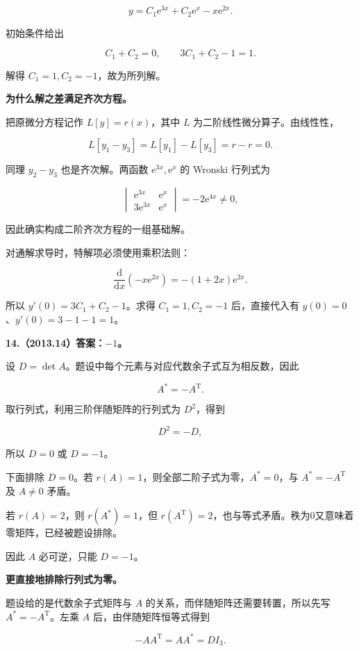 \documentclass[UTF8,11pt,fontset=windows]{ctexart}
\begin{document}
$$
y=C_1\mathrm e^{3x}+C_2\mathrm e^x-x\mathrm e^{2x}.
$$

初始条件给出

$$
C_1+C_2=0,\qquad3C_1+C_2-1=1.
$$

解得 $C_1=1,C_2=-1$，故为所列解。

\textbf{为什么解之差满足齐次方程。}

把原微分方程记作 $L[y]=r(x)$，其中 $L$ 为二阶线性微分算子。由线性性，

$$
L[y_1-y_3]=L[y_1]-L[y_3]=r-r=0.
$$

同理 $y_2-y_3$ 也是齐次解。两函数 $\mathrm e^{3x},\mathrm e^x$ 的 Wronski 行列式为

$$
\begin{vmatrix}\mathrm e^{3x}&\mathrm e^x\\3\mathrm e^{3x}&\mathrm e^x\end{vmatrix}
=-2\mathrm e^{4x}\ne0,
$$

因此确实构成二阶齐次方程的一组基础解。

对通解求导时，特解项必须使用乘积法则：

$$
\frac{\mathrm d}{\mathrm dx}(-x\mathrm e^{2x})=-(1+2x)\mathrm e^{2x}.
$$

所以 $y'(0)=3C_1+C_2-1$。求得 $C_1=1,C_2=-1$ 后，直接代入有 $y(0)=0$、$y'(0)=3-1-1=1$。

\clearpage

\textbf{14.（2013.14）答案：$-1$。}

设 $D=\det A$。题设中每个元素与对应代数余子式互为相反数，因此

$$
A^*=-A^{\mathrm T}.
$$

取行列式，利用三阶伴随矩阵的行列式为 $D^2$，得到

$$
D^2=-D,
$$

所以 $D=0$ 或 $D=-1$。

下面排除 $D=0$。若 $r(A)=1$，则全部二阶子式为零，$A^*=0$，与 $A^*=-A^{\mathrm T}$ 及 $A\ne0$ 矛盾。

若 $r(A)=2$，则 $r(A^*)=1$，但 $r(A^{\mathrm T})=2$，也与等式矛盾。秩为0又意味着零矩阵，已经被题设排除。

因此 $A$ 必可逆，只能 $D=-1$。

\textbf{更直接地排除行列式为零。}

题设给的是代数余子式矩阵与 $A$ 的关系，而伴随矩阵还需要转置，所以先写 $A^*=-A^{\mathrm T}$。左乘 $A$ 后，由伴随矩阵恒等式得到

$$
-AA^{\mathrm T}=AA^*=DI_3.
$$
\end{document}
